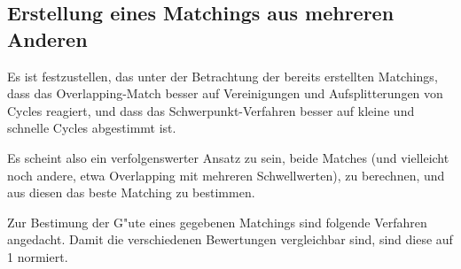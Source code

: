 \subsection{Erstellung eines Matchings aus mehreren Anderen}


Es ist festzustellen, das unter der Betrachtung der bereits erstellten Matchings, dass das Overlapping-Match besser auf Vereinigungen und Aufsplitterungen von Cycles reagiert, und dass das Schwerpunkt-Verfahren besser auf kleine und schnelle Cycles abgestimmt ist. 

Es scheint also ein verfolgenswerter Ansatz zu sein, beide Matches (und vielleicht noch andere, etwa Overlapping mit mehreren Schwellwerten), zu berechnen, und aus diesen das beste Matching zu bestimmen. 

Zur Bestimung der G"ute eines gegebenen Matchings sind folgende Verfahren angedacht. Damit die verschiedenen Bewertungen vergleichbar sind, sind diese auf 1 normiert.

